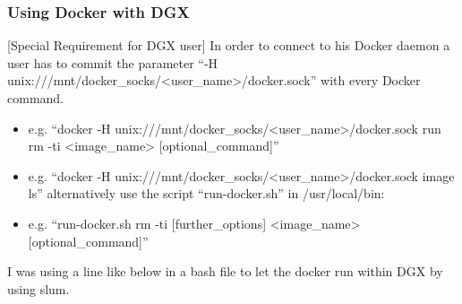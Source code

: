 \documentclass[letterpaper,10pt,english]{sphinxmanual}
\begin{document}
\subsubsection{Using Docker with DGX}
\label{\detokenize{usage/installation:using-docker-with-dgx}}
{[}Special Requirement for DGX user{]} In order to connect to his Docker daemon a user has to commit the parameter “-H unix:///mnt/docker\_socks/\textless{}user\_name\textgreater{}/docker.sock” with every Docker command.
\begin{itemize}
\item {} 
e.g. “docker -H unix:///mnt/docker\_socks/\textless{}user\_name\textgreater{}/docker.sock run \textendash{}rm -ti \textless{}image\_name\textgreater{} {[}optional\_command{]}”

\item {} 
e.g. “docker -H unix:///mnt/docker\_socks/\textless{}user\_name\textgreater{}/docker.sock image ls” alternatively use the script “run-docker.sh” in /usr/local/bin:

\item {} 
e.g. “run-docker.sh \textendash{}rm -ti {[}further\_options{]} \textless{}image\_name\textgreater{} {[}optional\_command{]}”

\end{itemize}

I was using a line like below in a bash file to let the docker run within DGX by using slum.

%
\begin{sphinxVerbatim}[commandchars=\\\{\}]
\end{sphinxVerbatim}
\end{document}
